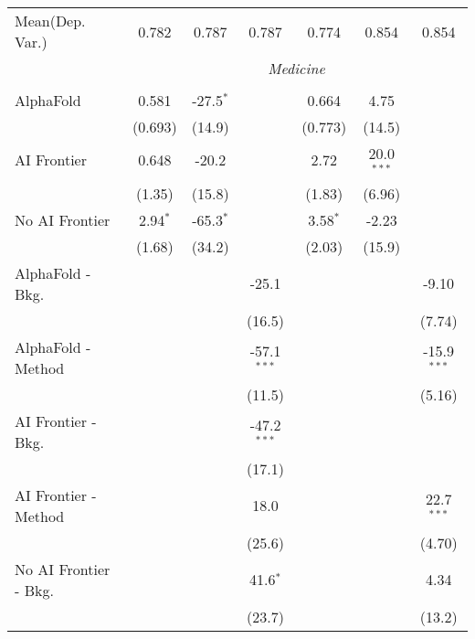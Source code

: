 \begin{tabular}{lcccccc}
Mean(Dep. Var.) & 0.782 & 0.787 & 0.787 & 0.774 & 0.854 & 0.854 \\
 & \multicolumn{6}{c}{\textit{Medicine}} \\ \\
   AlphaFold               & 0.581      & -27.5$^{*}$ &               & 0.664      & 4.75         &   \\   
                           & (0.693)    & (14.9)      &               & (0.773)    & (14.5)       &   \\   
   AI Frontier             & 0.648      & -20.2       &               & 2.72       & 20.0$^{***}$ &   \\   
                           & (1.35)     & (15.8)      &               & (1.83)     & (6.96)       &   \\   
   No AI Frontier          & 2.94$^{*}$ & -65.3$^{*}$ &               & 3.58$^{*}$ & -2.23        &   \\   
                           & (1.68)     & (34.2)      &               & (2.03)     & (15.9)       &   \\   
   AlphaFold - Bkg.        &            &             & -25.1         &            &              & -9.10\\   
                           &            &             & (16.5)        &            &              & (7.74)\\   
   AlphaFold - Method      &            &             & -57.1$^{***}$ &            &              & -15.9$^{***}$\\   
                           &            &             & (11.5)        &            &              & (5.16)\\   
   AI Frontier - Bkg.      &            &             & -47.2$^{***}$ &            &              &   \\   
                           &            &             & (17.1)        &            &              &   \\   
   AI Frontier - Method    &            &             & 18.0          &            &              & 22.7$^{***}$\\   
                           &            &             & (25.6)        &            &              & (4.70)\\   
   No AI Frontier - Bkg.   &            &             & 41.6$^{*}$    &            &              & 4.34\\   
                           &            &             & (23.7)        &            &              & (13.2)\\   

\end{tabular}

